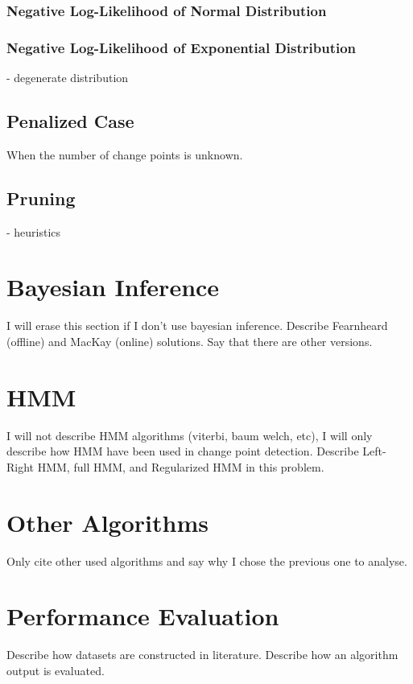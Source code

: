 \subsubsection{Negative Log-Likelihood of Normal Distribution}
\subsubsection{Negative Log-Likelihood of Exponential Distribution}

- degenerate distribution

\subsection{Penalized Case}

When the number of change points is unknown.

\subsection{Pruning}
- heuristics

\section{Bayesian Inference}
I will erase this section if I don't use bayesian inference. Describe Fearnheard (offline) and MacKay (online) solutions. Say that there are other versions.

\section{HMM}
I will not describe HMM algorithms (viterbi, baum welch, etc), I will only describe how HMM have been used in change point detection. Describe Left-Right HMM, full HMM, and Regularized HMM in this problem.

\section{Other Algorithms}
Only cite other used algorithms and say why I chose the previous one to analyse.

\section{Performance Evaluation}
  Describe how datasets are constructed in literature. Describe how an algorithm output is evaluated.

